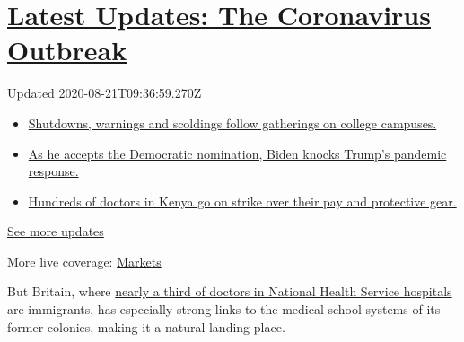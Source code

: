 \hypertarget{latest-updates-the-coronavirus-outbreak}{%
\section{\texorpdfstring{\href{https://www.nytimes3xbfgragh.onion/2020/08/21/world/covid-19-coronavirus.html?action=click\&pgtype=Article\&state=default\&region=MAIN_CONTENT_1\&context=storylines_live_updates}{Latest
Updates: The Coronavirus
Outbreak}}{Latest Updates: The Coronavirus Outbreak}}\label{latest-updates-the-coronavirus-outbreak}}

Updated 2020-08-21T09:36:59.270Z

\begin{itemize}
\tightlist
\item
  \href{https://www.nytimes3xbfgragh.onion/2020/08/21/world/covid-19-coronavirus.html?action=click\&pgtype=Article\&state=default\&region=MAIN_CONTENT_1\&context=storylines_live_updates\#link-4690b6aa}{Shutdowns,
  warnings and scoldings follow gatherings on college campuses.}
\item
  \href{https://www.nytimes3xbfgragh.onion/2020/08/21/world/covid-19-coronavirus.html?action=click\&pgtype=Article\&state=default\&region=MAIN_CONTENT_1\&context=storylines_live_updates\#link-324af071}{As
  he accepts the Democratic nomination, Biden knocks Trump's pandemic
  response.}
\item
  \href{https://www.nytimes3xbfgragh.onion/2020/08/21/world/covid-19-coronavirus.html?action=click\&pgtype=Article\&state=default\&region=MAIN_CONTENT_1\&context=storylines_live_updates\#link-35890b73}{Hundreds
  of doctors in Kenya go on strike over their pay and protective gear.}
\end{itemize}

\href{https://www.nytimes3xbfgragh.onion/2020/08/21/world/covid-19-coronavirus.html?action=click\&pgtype=Article\&state=default\&region=MAIN_CONTENT_1\&context=storylines_live_updates}{See
more updates}

More live coverage:
\href{https://www.nytimes3xbfgragh.onion/live/2020/08/20/business/stock-market-today-coronavirus?action=click\&pgtype=Article\&state=default\&region=MAIN_CONTENT_1\&context=storylines_live_updates}{Markets}

But Britain, where
\href{https://www.ons.gov.uk/peoplepopulationandcommunity/populationandmigration/internationalmigration/articles/internationalmigrationandthehealthcareworkforce/2019-08-15}{nearly
a third of doctors in National Health Service hospitals} are immigrants,
has especially strong links to the medical school systems of its former
colonies, making it a natural landing place.

